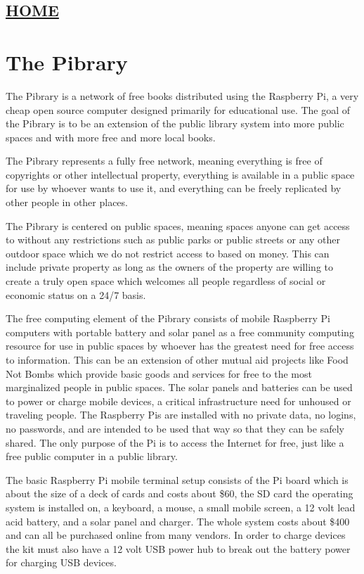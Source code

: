 \hypertarget{home}{%
\subsection{\texorpdfstring{\href{scrolls/home}{HOME}}{HOME}}\label{home}}

\hypertarget{the-pibrary}{%
\section{The Pibrary}\label{the-pibrary}}

The Pibrary is a network of free books distributed using the Raspberry
Pi, a very cheap open source computer designed primarily for educational
use. The goal of the Pibrary is to be an extension of the public library
system into more public spaces and with more free and more local books.

The Pibrary represents a fully free network, meaning everything is free
of copyrights or other intellectual property, everything is available in
a public space for use by whoever wants to use it, and everything can be
freely replicated by other people in other places.

The Pibrary is centered on public spaces, meaning spaces anyone can get
access to without any restrictions such as public parks or public
streets or any other outdoor space which we do not restrict access to
based on money. This can include private property as long as the owners
of the property are willing to create a truly open space which welcomes
all people regardless of social or economic status on a 24/7 basis.

The free computing element of the Pibrary consists of mobile Raspberry
Pi computers with portable battery and solar panel as a free community
computing resource for use in public spaces by whoever has the greatest
need for free access to information. This can be an extension of other
mutual aid projects like Food Not Bombs which provide basic goods and
services for free to the most marginalized people in public spaces. The
solar panels and batteries can be used to power or charge mobile
devices, a critical infrastructure need for unhoused or traveling
people. The Raspberry Pis are installed with no private data, no logins,
no passwords, and are intended to be used that way so that they can be
safely shared. The only purpose of the Pi is to access the Internet for
free, just like a free public computer in a public library.

The basic Raspberry Pi mobile terminal setup consists of the Pi board
which is about the size of a deck of cards and costs about \$60, the SD
card the operating system is installed on, a keyboard, a mouse, a small
mobile screen, a 12 volt lead acid battery, and a solar panel and
charger. The whole system costs about \$400 and can all be purchased
online from many vendors. In order to charge devices the kit must also
have a 12 volt USB power hub to break out the battery power for charging
USB devices.

